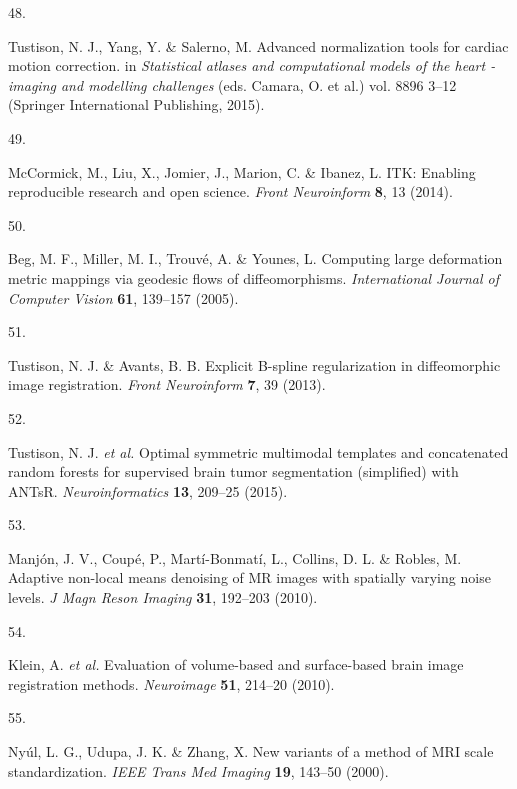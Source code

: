 \documentclass[
  12pt,
]{article}
\newlength{\cslhangindent}
\newlength{\csllabelwidth}
\newenvironment{CSLReferences}[2] %
 {%
  \setlength{\parindent}{0pt}
  \ifodd #1 \everypar{\setlength{\hangindent}{\cslhangindent}}\ignorespaces\fi
  \ifnum #2 > 0
  \setlength{\parskip}{#2\baselineskip}
  \fi
 }%
 {}
\newcommand{\CSLLeftMargin}[1]{\parbox[t]{\csllabelwidth}{#1}}
\newcommand{\CSLRightInline}[1]{\parbox[t]{\linewidth - \csllabelwidth}{#1}\break}
\begin{document}
\begin{CSLReferences}{0}{0}
\leavevmode{}%
\CSLLeftMargin{48. }
\CSLRightInline{Tustison, N. J., Yang, Y. \& Salerno, M. Advanced
normalization tools for cardiac motion correction. in \emph{Statistical
atlases and computational models of the heart - imaging and modelling
challenges} (eds. Camara, O. et al.) vol. 8896 3--12 (Springer
International Publishing, 2015).}

\leavevmode{}%
\CSLLeftMargin{49. }
\CSLRightInline{McCormick, M., Liu, X., Jomier, J., Marion, C. \&
Ibanez, L. ITK: Enabling reproducible research and open science.
\emph{Front Neuroinform} \textbf{8}, 13 (2014).}

\leavevmode{}%
\CSLLeftMargin{50. }
\CSLRightInline{Beg, M. F., Miller, M. I., Trouvé, A. \& Younes, L.
Computing large deformation metric mappings via geodesic flows of
diffeomorphisms. \emph{International Journal of Computer Vision}
\textbf{61}, 139--157 (2005).}

\leavevmode{}%
\CSLLeftMargin{51. }
\CSLRightInline{Tustison, N. J. \& Avants, B. B. Explicit {B}-spline
regularization in diffeomorphic image registration. \emph{Front
Neuroinform} \textbf{7}, 39 (2013).}

\leavevmode{}%
\CSLLeftMargin{52. }
\CSLRightInline{Tustison, N. J. \emph{et al.} Optimal symmetric
multimodal templates and concatenated random forests for supervised
brain tumor segmentation (simplified) with ANTsR.
\emph{Neuroinformatics} \textbf{13}, 209--25 (2015).}

\leavevmode{}%
\CSLLeftMargin{53. }
\CSLRightInline{Manjón, J. V., Coupé, P., Martí-Bonmatí, L., Collins, D.
L. \& Robles, M. Adaptive non-local means denoising of {MR} images with
spatially varying noise levels. \emph{J Magn Reson Imaging} \textbf{31},
192--203 (2010).}

\leavevmode{}%
\CSLLeftMargin{54. }
\CSLRightInline{Klein, A. \emph{et al.} Evaluation of volume-based and
surface-based brain image registration methods. \emph{Neuroimage}
\textbf{51}, 214--20 (2010).}

\leavevmode{}%
\CSLLeftMargin{55. }
\CSLRightInline{Nyúl, L. G., Udupa, J. K. \& Zhang, X. New variants of a
method of MRI scale standardization. \emph{IEEE Trans Med Imaging}
\textbf{19}, 143--50 (2000).}


\end{CSLReferences}
\end{document}
